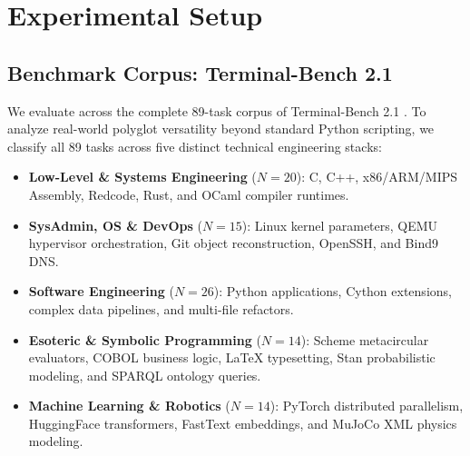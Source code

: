 \section{Experimental Setup}
\label{sec:setup}

\subsection{Benchmark Corpus: Terminal-Bench 2.1}
We evaluate across the complete 89-task corpus of Terminal-Bench 2.1 \cite{shaw2025terminalbench}. To analyze real-world polyglot versatility beyond standard Python scripting, we classify all 89 tasks across five distinct technical engineering stacks:
\begin{itemize}
    \item \textbf{Low-Level \& Systems Engineering} ($N=20$): C, C++, x86/ARM/MIPS Assembly, Redcode, Rust, and OCaml compiler runtimes.
    \item \textbf{SysAdmin, OS \& DevOps} ($N=15$): Linux kernel parameters, QEMU hypervisor orchestration, Git object reconstruction, OpenSSH, and Bind9 DNS.
    \item \textbf{Software Engineering} ($N=26$): Python applications, Cython extensions, complex data pipelines, and multi-file refactors.
    \item \textbf{Esoteric \& Symbolic Programming} ($N=14$): Scheme metacircular evaluators, COBOL business logic, LaTeX typesetting, Stan probabilistic modeling, and SPARQL ontology queries.
    \item \textbf{Machine Learning \& Robotics} ($N=14$): PyTorch distributed parallelism, HuggingFace transformers, FastText embeddings, and MuJoCo XML physics modeling.
\end{itemize}


